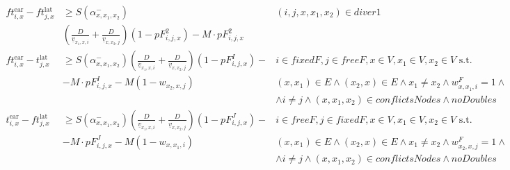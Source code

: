 \documentclass[../thesis.tex]{subfiles}
\begin{document}
{\begin{align}
ft^\text{ear}_{i,x}- ft^\text{lat}_{j,x}&\geq S(\alpha^-_{x,x_1,x_2})&
(i,j,x,x_1,x_2)\in diver1
\nonumber\\
&(\frac D {\underline v_{x_1,x,i}} + \frac D{\underline v_{x,x_2,j}}) (1-pF^2_{i,j,x}) -M\cdot pF^2_{i,j,x}\\
ft^\text{ear}_{i,x}- t^\text{lat}_{j,x}&\geq S(\alpha^-_{x,x_1,x_2})(\frac D {\underline v_{x_1,x,i}} + \frac D{\underline v_{x,x_2,j}}) (1-pF^I_{i,j,x})-&
i \in fixedF, j\in freeF, x\in V,x_1\in V,x_2\in V\text { s.t. }
\nonumber\\
&  -M\cdot pF^I_{i,j,x} - M(1-w_{x_2,x,j})&
(x,x_1)\in E\land (x_2,x)\in E\land x_1\neq x_2\land w^F_{x,x_1,i}=1\land\nonumber\\
&&\land i\neq j \land (x,x_1,x_2)\in conflictsNodes\land noDoubles\\
t^\text{ear}_{i,x}- ft^\text{lat}_{j,x}&\geq S(\alpha^-_{x,x_1,x_2}) (\frac D {\underline v_{x_1,x,i}} + \frac D{\underline v_{x,x_2,j}}) (1-pF^J_{i,j,x})-&
i \in freeF, j\in fixedF, x\in V,x_1\in V,x_2\in V\text { s.t. }
\nonumber\\
 &-M\cdot pF^J_{i,j,x} - M(1-w_{x,x_1,i})&
(x,x_1)\in E\land (x_2,x)\in E\land x_1\neq x_2\land w^F_{x_2,x,j}=1\land\nonumber\\
&&\land i\neq j\land (x,x_1,x_2)\in conflictsNodes\land noDoubles
\end{align}


}
\end{document}
